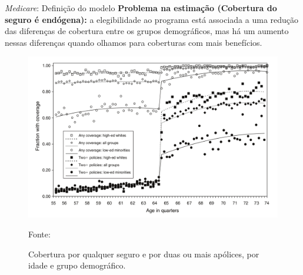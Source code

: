 \documentclass[aspectratio=1610, 10pt]{beamer}
\begin{document}
\begin{frame}{\textit{Medicare}: Definição do modelo}
            \justifying
            \textbf{Problema na estimação (Cobertura do seguro é endógena):} a elegibilidade ao programa está associada a uma redução das diferenças de cobertura entre os grupos demográficos, mas há um aumento nessas diferenças quando olhamos para coberturas com mais benefícios.

            \begin{figure}
                \centering
                \includegraphics[scale = 0.33]{FigurasAplicacao/endogeneidade.png}
                \vspace{-0.4cm}
                \caption{Cobertura por qualquer seguro e por duas ou mais apólices, por idade e grupo demográfico.}
                \tiny{Fonte: \cite{card2008impact}}
                \label{endogeneidade}
            \end{figure}

\end{frame}
\end{document}
